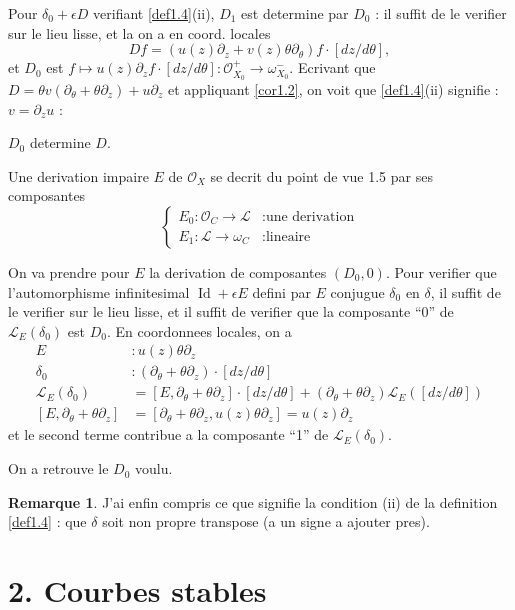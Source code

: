 \documentclass[11pt,a4paper]{article}
\theoremstyle{plain}
\theoremstyle{definition}
\newtheorem{remark}[theorem]{Remarque}
\DeclareMathOperator{\Id}{Id}
\begin{document}
Pour $\delta_0 + \epsilon D$ verifiant \ref{def1.4}(ii), $D_1$ est determine par $D_0$ : il suffit de le verifier sur le lieu lisse, et la on a en coord. locales
\[
Df = (u(z)\partial_z + v(z)\theta\partial_\theta)f \cdot [dz/d\theta],
\]
et $D_0$ est $f \mapsto u(z)\partial_z f \cdot [dz/d\theta] : \mathcal{O}_{X_0}^+ \to \omega_{X_0}^-$. Ecrivant que $D = \theta v(\partial_\theta + \theta\partial_z) + u\partial_z$ et appliquant \ref{cor1.2}, on voit que \ref{def1.4}(ii) signifie : $v = \partial_z u$ :

$D_0$ determine $D$.

\newpage

Une derivation impaire $E$ de $\mathcal{O}_X$ se decrit du point de vue 1.5 par ses composantes
\[
\begin{cases}
E_0 : \mathcal{O}_C \to \mathcal{L} & : \text{une derivation} \\
E_1 : \mathcal{L} \to \omega_C & : \text{lineaire}
\end{cases}
\]

On va prendre pour $E$ la derivation de composantes $(D_0, 0)$. Pour verifier que l'automorphisme infinitesimal $\Id + \epsilon E$ defini par $E$ conjugue $\delta_0$ en $\delta$, il suffit de le verifier sur le lieu lisse, et il suffit de verifier que la composante ``0'' de $\mathcal{L}_E(\delta_0)$ est $D_0$. En coordonnees locales, on a
\[
\begin{aligned}
E &: u(z)\theta\partial_z \\
\delta_0 &: (\partial_\theta + \theta\partial_z) \cdot [dz/d\theta] \\
\mathcal{L}_E(\delta_0) &= [E, \partial_\theta + \theta\partial_z] \cdot [dz/d\theta] + (\partial_\theta + \theta\partial_z) \mathcal{L}_E([dz/d\theta]) \\
[E, \partial_\theta + \theta\partial_z] &= [\partial_\theta + \theta\partial_z, u(z)\theta\partial_z] = u(z)\partial_z
\end{aligned}
\]
et le second terme contribue a la composante ``1'' de $\mathcal{L}_E(\delta_0)$.

On a retrouve le $D_0$ voulu.

\begin{remark}\label{rem1.8}
J'ai enfin compris ce que signifie la condition (ii) de la definition \ref{def1.4} : que $\delta$ soit non propre transpose (a un signe a ajouter pres).
\end{remark}

\newpage

\section*{2. Courbes stables}
\end{document}
